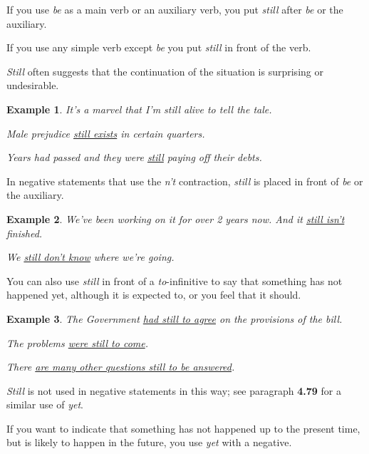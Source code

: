 \documentclass[oneside]{book}
\numberwithin{equation}{section}
\newtheorem{example}{Example}[section]
\begin{document}
If you use \textit{be} as a main verb or an auxiliary verb, you put \textit{still} after \textit{be} or the auxiliary.

If you use any simple verb except \textit{be} you put \textit{still} in front of the verb.

\textit{Still} often suggests that the continuation of the situation is surprising or undesirable.
\begin{example}
    It's a marvel that I'm still alive to tell the tale.
    
    Male prejudice \underline{still exists} in certain quarters.
    
    Years had passed and they were \underline{still} paying off their debts.
\end{example}
In negative statements that use the \textit{n't} contraction, \textit{still} is placed in front of \textit{be} or the auxiliary.
\begin{example}
    We've been working on it for over 2 years now. And it \underline{still isn't} finished.
    
    We \underline{still don't know} where we're going.
\end{example}
%
\noindent{} You can also use \textit{still} in front of a \textit{to}-infinitive to say that something has not happened yet, although it is expected to, or you feel that it should.
\begin{example}
    The Government \underline{had still to agree} on the provisions of the bill.
    
    The problems \underline{were still to come}.
    
    There \underline{are many other questions still to be answered}.
\end{example}
\textit{Still} is not used in negative statements in this way; see paragraph \textbf{4.79} for a similar use of \textit{yet}.

%
\noindent{} If you want to indicate that something has not happened up to the present time, but is likely to happen in the future, you use \textit{yet} with a negative.
\end{document}
